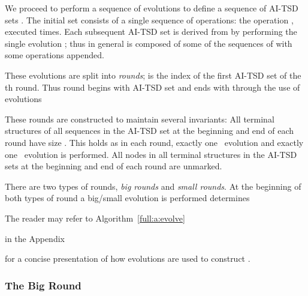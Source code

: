 {We proceed to perform a sequence of evolutions  to define} a sequence of AI-TSD sets . The initial set  consists of a single sequence of operations: the operation \opIns, executed  times. Each subsequent AI-TSD  set  is derived from    by performing the single evolution ; thus in general  is composed of some of the sequences of  with some operations appended. 

These evolutions are split into \emph{rounds};  is the index of the first AI-TSD set of the th round. Thus round  begins with AI-TSD set  and ends with  through the use of evolutions

\begin{fullonly}

\end{fullonly}
 These rounds are constructed to maintain several invariants:
\shortfull{}{\begin{itemize}\item}
All terminal structures of all sequences in the AI-TSD set at the beginning and end of each round have size . This holds as in each round, exactly one \opIns\ evolution and exactly one \opEm\ evolution is performed.
\shortfull{}{\item} All nodes in all terminal structures in the AI-TSD sets at the beginning and end of each round are unmarked.
\shortfull{}{\end{itemize}}

There are two types of rounds, \emph{big rounds} and \emph{small rounds}. 
At the beginning of both types of round a big/small evolution is performed determines 
\begin{fullonly}

\end{fullonly}
The reader may refer to Algorithm~\ref{full:a:evolve} 
\begin{shortonly}
in the Appendix
\end{shortonly}
for a concise presentation of how evolutions are used to construct . 


\subsubsection{The Big Round} 

